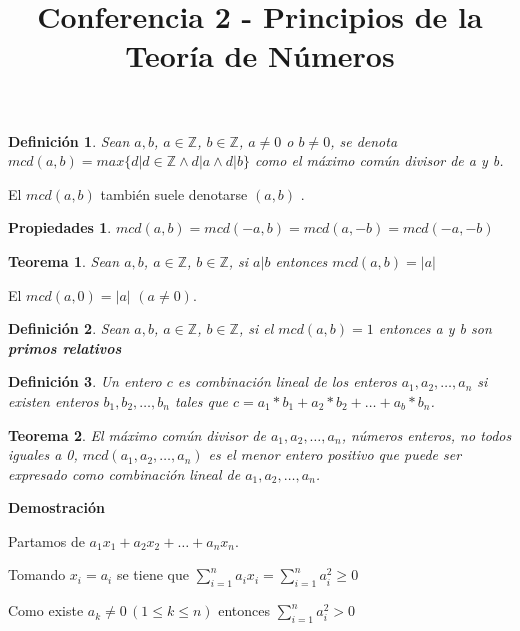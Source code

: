 \documentclass[a4paper,1pt]{report}
\title{Conferencia 2 - Principios de la Teoría de Números}
\author{}
\newtheorem*{teo}{Teorema}
\newtheorem*{dfn}{Definición}
\newtheorem*{prp}{Propiedades}
\begin{document}
\maketitle





\begin{dfn}
 Sean $a,b$, $a\in\mathbb{Z}$, $b\in\mathbb{Z}$, $a\neq 0$ o $b\neq 0$, se denota\\ $mcd(a,b)=max\{d|   d\in\mathbb{Z}\wedge d|a\wedge d|b\}$ como el máximo común divisor de a y b.
\end{dfn}

El $mcd(a,b)$ también suele denotarse $(a,b)$ .



\begin{prp}
 $mcd(a,b)=mcd(-a,b)=mcd(a,-b)=mcd(-a,-b)$
\end{prp}

\begin{teo}
 Sean $a,b$, $a\in\mathbb{Z}$, $b\in\mathbb{Z}$, si $a|b$ entonces $mcd(a,b)=|a|$
\end{teo}

El $mcd(a,0)=|a|$ $(a\neq0)$.


\begin{dfn}
 Sean $a,b$, $a\in\mathbb{Z}$, $b\in\mathbb{Z}$, si el $mcd(a,b)=1$ entonces a y b son \textbf{primos relativos}
\end{dfn}

\begin{dfn}
 Un entero $c$ es combinación lineal de los enteros $a_1,a_2,\dots,a_n$ si existen enteros $b_1,b_2,\dots,b_n$ tales que $c=a_1*b_1+a_2*b_2+\dots+a_b*b_n$.
\end{dfn}

\begin{teo}
 El máximo común divisor de  $a_1,a_2,\dots,a_n$, números enteros, no todos iguales a 0, $mcd(a_1,a_2,\dots,a_n)$ es el menor entero positivo que puede ser expresado como combinación lineal de $a_1,a_2,\dots,a_n$.
\end{teo}

\textbf{Demostración}

Partamos de $a_1x_1+a_2x_2+\dots+a_nx_n$.

Tomando $x_i=a_i$ se tiene que $\sum^n_{i=1}a_ix_i=\sum^n_{i=1}a_i^2\geq0$

Como existe $a_k\neq 0 \, (1\leq k \leq n)$ entonces $\sum^n_{i=1}a_i^2>0$
\end{document}

